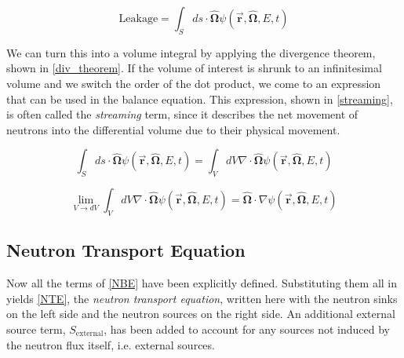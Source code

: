 \begin{equation}
\label{leakage_surface}
\mathrm{Leakage} = \int_S ds \cdot \boldsymbol{\hat{\Omega}} \psi(\boldsymbol{\vec{r}},\boldsymbol{\hat{\Omega}},E,t)
\end{equation}
 
 We can turn this into a volume integral by applying the divergence theorem, shown in \eqref{div_theorem}.  If the volume of interest is shrunk to an infinitesimal volume and we switch the order of the dot product, we come to an expression that can be used in the balance equation.  This expression, shown in \eqref{streaming}, is often called the \emph{streaming} term, since it describes the net movement of neutrons into the differential volume due to their physical movement.
 
\begin{equation}
\label{div_theorem}
\int_S ds \cdot \boldsymbol{\hat{\Omega}} \psi(\boldsymbol{\vec{r}},\boldsymbol{\hat{\Omega}},E,t) = \int_V dV \nabla \cdot \boldsymbol{\hat{\Omega}}  \psi(\boldsymbol{\vec{r}},\boldsymbol{\hat{\Omega}},E,t)
\end{equation}

\begin{equation}
\label{streaming}
 \lim_{V\to dV} \int_V dV \nabla \cdot \boldsymbol{\hat{\Omega}}  \psi(\boldsymbol{\vec{r}},\boldsymbol{\hat{\Omega}},E,t) =  \boldsymbol{\hat{\Omega}}  \cdot \nabla\psi(\boldsymbol{\vec{r}},\boldsymbol{\hat{\Omega}},E,t) 
 \end{equation}
 

\subsection{Neutron Transport Equation}

Now all the terms of \eqref{NBE} have been explicitly defined.  Substituting them all in yields \eqref{NTE}, the \emph{neutron transport equation}, written here with the neutron sinks on the left side and the neutron sources on the right side.  An additional external source term, $S_{\mathrm{external}}$, has been added to account for any sources not induced by the neutron flux itself, i.e. external sources.  

